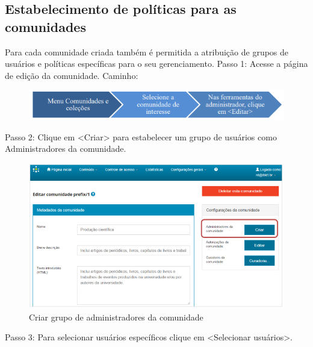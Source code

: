 \documentclass[12pt,hidelinks]{article}
\begin{document}
\newpage
    \subsection{Estabelecimento de políticas para as comunidades}

    Para cada comunidade criada também é permitida a atribuição de grupos de usuários e políticas específicas para o seu gerenciamento.
    \singlespacing
    Passo 1: Acesse a página de edição da comunidade. Caminho:
    
    \begin{figure}[!htp]
                \centering
                \includegraphics[scale=0.6]{figura/MenuComunidadesColecoes.png}
            \label{Rotulo}
        \end{figure}
    
    Passo 2: Clique em <Criar> para estabelecer um grupo de usuários como Administradores da comunidade.
    
    \begin{figure}[!htp]
                \centering
                \includegraphics[scale=0.7]{figura/Figura19.png}
                \caption{Criar grupo de administradores da comunidade}
            \label{Rotulo}
        \end{figure}
    
    Passo 3: Para selecionar usuários específicos clique em <Selecionar usuários>.
    
\end{document}
